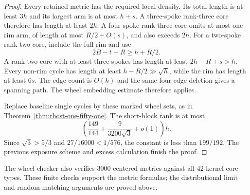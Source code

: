 \begin{proof}
Every retained metric has the required local density.
Its total length is at least $3h$ and its largest arm is at most $h+s$.
A three-spoke rank-three core therefore has length at least $2h$.
A four-spoke rank-three core omits at most one rim arm, of length at most $R/2+O(s)$, and also exceeds $2h$.
For a two-spoke rank-two core, include the full rim and use
\[
 2B-t+R\ge h+R/2.
\]
A rank-two core with at least three spokes has length at least $2h-R+s>h$.
Every non-rim cycle has length at least $h-R/2\gg\sqrt h$, while the rim has length at least $6s$.
The edge count is $O(h)$ and the same four-edge deletion gives a spanning path.
The wheel embedding estimate therefore applies.

Replace baseline single cycles by these marked wheel sets, as in Theorem~\ref{thm:rhost-one-fifty-one}.
The short-block rank is at most
\[
 \left(\frac{149}{144}+\frac9{3200\sqrt3}+o(1)\right)h.
\]
Since $\sqrt3>5/3$ and $27/16000<1/576$, the constant is less than $199/192$.
The previous exposure scheme and excess calculation finish the proof.
\end{proof}

The wheel checker also verifies 3000 centered metrics against all 42 kernel core types.
These finite checks support the metric formulas; the distributional limit and random matching arguments are proved above.
